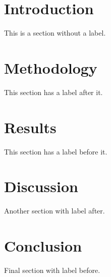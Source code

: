 \documentclass{article}
\begin{document}
\section{Introduction}

This is a section without a label.

\section{Methodology}
\label{sec:methodology}

This section has a label after it.

\label{sec:results}
\section{Results}

This section has a label before it.

\section{Discussion}

\label{sec:discussion}

Another section with label after.

  \label{sec:conclusion}

\section{Conclusion}

Final section with label before.
\end{document}
